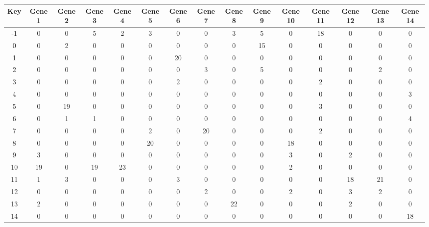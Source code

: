 \begin{tabular}{|c|c|c|c|c|c|c|c|c|c|c|c|c|c|c|}
\hline
Key & Gene 1 & Gene 2 & Gene 3 & Gene 4 & Gene 5 & Gene 6 & Gene 7 & Gene 8 & Gene 9 & Gene 10 & Gene 11 & Gene 12 & Gene 13 & Gene 14 \\
\hline
-1 & 0 & 0 & 5 & 2 & 3 & 0 & 0 & 3 & 5 & 0 & 18 & 0 & 0 & 0 \\
0 & 0 & 2 & 0 & 0 & 0 & 0 & 0 & 0 & 15 & 0 & 0 & 0 & 0 & 0 \\
1 & 0 & 0 & 0 & 0 & 0 & 20 & 0 & 0 & 0 & 0 & 0 & 0 & 0 & 0 \\
2 & 0 & 0 & 0 & 0 & 0 & 0 & 3 & 0 & 5 & 0 & 0 & 0 & 2 & 0 \\
3 & 0 & 0 & 0 & 0 & 0 & 2 & 0 & 0 & 0 & 0 & 2 & 0 & 0 & 0 \\
4 & 0 & 0 & 0 & 0 & 0 & 0 & 0 & 0 & 0 & 0 & 0 & 0 & 0 & 3 \\
5 & 0 & 19 & 0 & 0 & 0 & 0 & 0 & 0 & 0 & 0 & 3 & 0 & 0 & 0 \\
6 & 0 & 1 & 1 & 0 & 0 & 0 & 0 & 0 & 0 & 0 & 0 & 0 & 0 & 4 \\
7 & 0 & 0 & 0 & 0 & 2 & 0 & 20 & 0 & 0 & 0 & 2 & 0 & 0 & 0 \\
8 & 0 & 0 & 0 & 0 & 20 & 0 & 0 & 0 & 0 & 18 & 0 & 0 & 0 & 0 \\
9 & 3 & 0 & 0 & 0 & 0 & 0 & 0 & 0 & 0 & 3 & 0 & 2 & 0 & 0 \\
10 & 19 & 0 & 19 & 23 & 0 & 0 & 0 & 0 & 0 & 2 & 0 & 0 & 0 & 0 \\
11 & 1 & 3 & 0 & 0 & 0 & 3 & 0 & 0 & 0 & 0 & 0 & 18 & 21 & 0 \\
12 & 0 & 0 & 0 & 0 & 0 & 0 & 2 & 0 & 0 & 2 & 0 & 3 & 2 & 0 \\
13 & 2 & 0 & 0 & 0 & 0 & 0 & 0 & 22 & 0 & 0 & 0 & 2 & 0 & 0 \\
14 & 0 & 0 & 0 & 0 & 0 & 0 & 0 & 0 & 0 & 0 & 0 & 0 & 0 & 18 \\
\hline
\end{tabular}